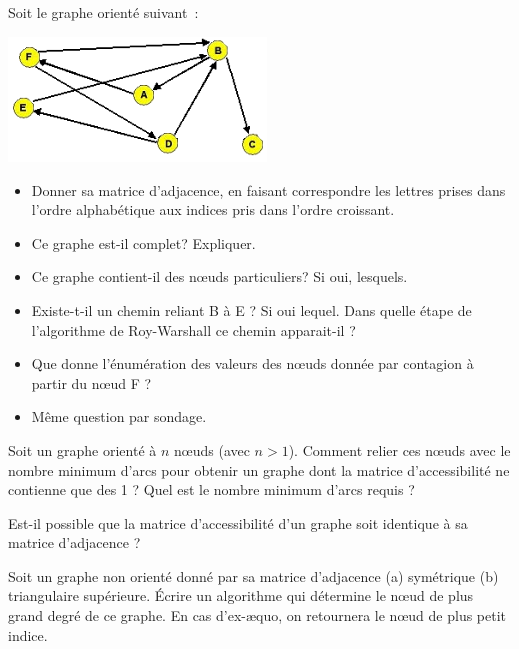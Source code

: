 	\begin{Exercice}{}
		Soit le graphe orienté suivant~:
		
		\begin{center}
		\includegraphics[width=6.854cm,height=3.318cm]{image/a2012Logique2eme-img056.png}
		\end{center}

		\begin{itemize}
			\item {
				Donner sa matrice d'adjacence, en faisant correspondre les lettres 
				prises dans l'ordre alphabétique aux indices pris
				dans l'ordre croissant.}
			\item {
				Ce graphe est-il complet? Expliquer.}
			\item {
				Ce graphe contient-il des n{\oe}uds particuliers? Si oui, lesquels.}
			\item {
				Existe-t-il un chemin reliant B à E ? Si oui lequel. 
				Dans quelle étape de l'algorithme de Roy-Warshall ce chemin
				apparait-il ? }
			\item {
				Que donne l'énumération des valeurs des n{\oe}uds donnée 
				par contagion à partir du n{\oe}ud F ? }
			\item {
				Même question par sondage.}
		\end{itemize}

	\end{Exercice}
	
	\begin{Exercice}{}
		Soit un graphe orienté à $n$ n{\oe}uds (avec $n>1$). 
		Comment relier ces n{\oe}uds avec le nombre minimum d'arcs pour 
		obtenir un graphe dont la matrice d'accessibilité ne contienne 
		que des 1 ? Quel est le nombre minimum d'arcs requis ?

	\end{Exercice}
	
	\begin{Exercice}{}
		Est-il possible que la matrice d'accessibilité 
		d'un graphe soit identique à sa matrice d'adjacence ?
	\end{Exercice}
	
	\begin{Exercice}{}
		Soit un graphe non orienté donné par sa matrice d'adjacence 
		(a) symétrique (b) triangulaire supérieure. 
		Écrire un algorithme qui détermine le n{\oe}ud de plus grand 
		degré de ce graphe. En cas d'ex-æquo, on retournera le n{\oe}ud de
		plus petit indice.

	\end{Exercice}
	
